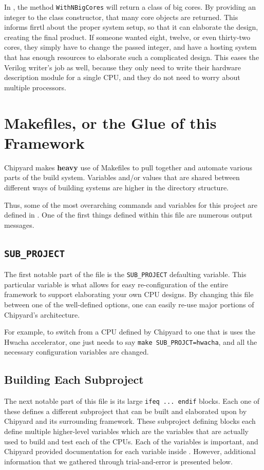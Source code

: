 In , the method \texttt{WithNBigCores} will return a class of big  cores.
By providing an integer to the class constructor, that many core objects are returned.
This informs \gls{firrtl} about the proper system setup, so that it can elaborate the design, creating the final product.
If someone wanted eight, twelve, or even thirty-two cores, they simply have to change the passed integer, and have a hosting system that has enough resources to elaborate such a complicated design.
This eases the Verilog writer's job as well, because they only need to write their hardware description module for a single CPU, and they do not need to worry about multiple processors.

\section{Makefiles, or the Glue of this Framework}\label{sec:Makefiles_in_Chipyard}
Chipyard makes \textbf{heavy} use of Makefiles to pull together and automate various parts of the build system.
Variables and/or values that are shared between different ways of building systems are higher in the directory structure.

Thus, some of the most overarching commands and variables for this project are defined in .
One of the first things defined within this file are numerous output messages.

\subsection{\texttt{SUB\_PROJECT}}\label{subsec:Makefile_SUB_PROJECT}
The first notable part of the  file is the \texttt{SUB\_PROJECT} defaulting variable.
This particular variable is what allows for easy re-configuration of the entire framework to support elaborating your own CPU designs.
By changing this file between one of the well-defined options, one can easily re-use major portions of Chipyard's architecture.

For example, to switch from a CPU defined by Chipyard to one that is uses the Hwacha accelerator, one just needs to say \texttt{make SUB_PROJCT=hwacha}, and all the necessary configuration variables are changed.

\subsection{Building Each Subproject}\label{subsec:Building_Each_Subproject}
The next notable part of this file is its large \texttt{ifeq ... endif} blocks.
Each one of these defines a different subproject that can be built and elaborated upon by Chipyard and its surrounding framework.
These subproject defining blocks each define multiple higher-level variables which are the variables that are actually used to build and test each of the CPUs.
Each of the variables is important, and Chipyard provided documentation for each variable inside .
However, additional information that we gathered through trial-and-error is presented below.

